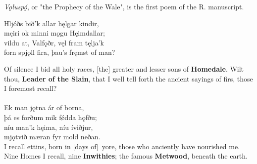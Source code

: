 \bookStart


\small{\emph{Vǫluspǫ́}, or "the Prophecy of the Wale\footnotemark[1]", is the first poem of the R. manuscript.}


\bva Hljóðs bið'k allar \hld hęlgar kindir, \\%
męiri ok minni \hld mǫgu Hęimdallar; \\%
vildu at, Valfǫðr, \hld vęl fram tęlja'k \\%
forn spjǫll fira, \hld þau's fręmst of man?

\bvb Of silence I bid all holy races\footnotemark[1], [the] greater and lesser sons of \textbf{Homedale}\footnotemark[2]. Wilt thou, \textbf{Leader of the Slain}\footnotemark[3], that I well tell forth the ancient sayings of firs\footnotemark[4], those I foremost recall?\footnotemark[5] \\
\\%

\bva Ek man jǫtna \hld ár of borna, \\%
þá es forðum \hld mik fǿdda hǫfðu; \\%
níu man'k hęima, \hld níu íviðjur\footnotemark[4], \\%
mjǫtvið mæran \hld fyr mold neðan.
\\%

\bvb I recall ettins, born in [days of] yore, those who anciently have nourished me. Nine Homes I recall, nine \textbf{Inwithies}; the famous \textbf{Metwood}, beneath the earth.

